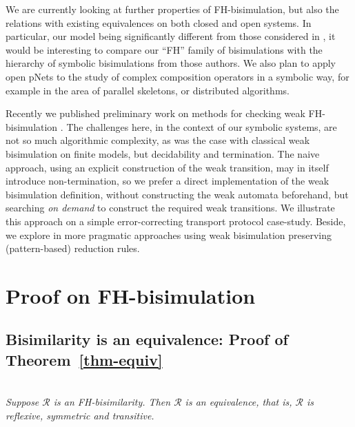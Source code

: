 \documentclass{elsarticle}
\begin{document}
We are currently  looking at further properties of FH-bisimulation, but also
the relations with existing equivalences on both closed and open systems. In particular, our model being significantly different from those considered in \cite{IngolfsdottirL:2001}, it
would be interesting to compare our ``FH'' family of bisimulations with the hierarchy of symbolic bisimulations from those authors.
We also plan to apply open pNets to the study of complex composition
operators in a symbolic way, for example in the area of parallel
skeletons, or distributed algorithms.

{Recently we published preliminary work on methods for checking} weak FH-bisimulation \cite{WangMZ:2021}.
The challenges here, in the context of our symbolic systems, are not so much algorithmic complexity,
as was the case with classical weak bisimulation on finite models, but decidability and termination.
The naive approach, using an explicit construction of the weak transition, may in itself introduce non-termination,
so we prefer a direct implementation of the weak bisimulation definition, without
constructing the weak automata beforehand, but searching \emph{on demand} to construct the required weak transitions. 
{We illustrate this approach on a simple error-correcting transport protocol case-study}.
Beside, we explore in \cite{wang:hal-03126313} more pragmatic approaches using weak bisimulation preserving (pattern-based) 
reduction rules.





% 


\newpage
\appendix    
\section{Proof on FH-bisimulation}
\subsection{Bisimilarity is an equivalence: Proof of Theorem~\ref{thm-equiv}}\label{thm-equiv-proof}~\\
        \emph{Suppose $\mathcal{R}$ 
       	is an FH-bisimilarity. Then $\mathcal{R}$ is an equivalence, that is, 
       	$\mathcal{R}$ is 
       	reflexive, symmetric and transitive.
       	}
       
\end{document}
